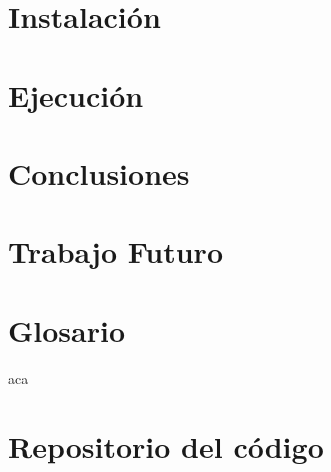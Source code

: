 \documentclass[twoside,letterpaper,12pt]{report}
\begin{document}
\chapter{Instalación}


\chapter{Ejecución}


\chapter{Conclusiones}


\chapter{Trabajo Futuro}


\chapter{Glosario} \label{chapGlosario}



\newpage



	
	aca
	\cite{czarnecki2000generative}
	\cite{wwwBoost}
	\cite{stroustrup2013c++}
	\cite{andrei2001modern}
	\cite{Wall2000}
	\cite{Boost}
	\cite{Karniadakis}
	\cite{Kernighan1988}

\newpage

\appendix
\chapter{Repositorio del código}

\end{document}
